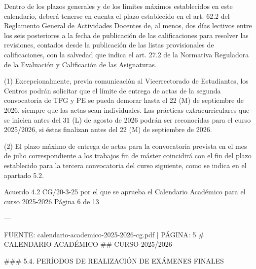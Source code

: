 \documentclass{article}
\begin{document}
\begin{itemize}
\begin{itemize}
\begin{scriptsize}
                  Dentro de los plazos generales y de los límites máximos establecidos en este calendario, deberá tenerse en cuenta el plazo establecido en el art. 62.2 del Reglamento General de Actividades Docentes de, al menos, dos días lectivos entre los seis posteriores a la fecha de publicación de las calificaciones para resolver las revisiones, contados desde la publicación de las listas provisionales de calificaciones, con la salvedad que indica el art. 27.2 de la Normativa Reguladora de la Evaluación y Calificación de las Asignaturas.

                  (1) Excepcionalmente, previa comunicación al Vicerrectorado de Estudiantes, los Centros podrán solicitar que el límite de entrega de actas de la segunda convocatoria de TFG y PE se pueda demorar hasta el 22 (M) de septiembre de 2026, siempre que las actas sean individuales. Las prácticas extracurriculares que se inicien antes del 31 (L) de agosto de 2026 podrán ser reconocidas para el curso 2025/2026, si éstas finalizan antes del 22 (M) de septiembre de 2026.

                  (2) El plazo máximo de entrega de actas para la convocatoria prevista en el mes de julio correspondiente a los trabajos fin de máster coincidirá con el fin del plazo establecido para la tercera convocatoria del curso siguiente, como se indica en el apartado 5.2.

                  Acuerdo 4.2 CG/20-3-25 por el que se aprueba el Calendario Académico para el curso 2025-2026  Página 6 de 13

                  ---

                  FUENTE: calendario-academico-2025-2026-cg.pdf | PÁGINA: 5
                  \# CALENDARIO ACADÉMICO
                  \#\# CURSO 2025/2026

                  \#\#\# 5.4. PERÍODOS DE REALIZACIÓN DE EXÁMENES FINALES


\end{scriptsize}
\end{itemize}
\end{itemize}
\end{document}
